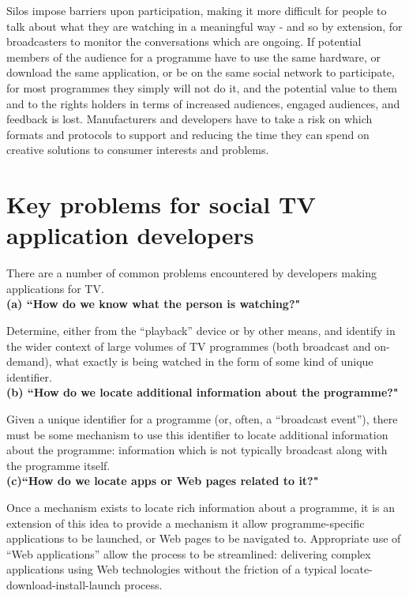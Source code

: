 \documentclass[]{article}%
\begin{document}
Silos impose barriers upon participation, making it more difficult for people to talk about what they are watching in a meaningful way - and so by extension, for broadcasters to monitor the conversations which are ongoing. If potential members of the audience for a programme have to use the same hardware, or download the same application, or be on the same social network to participate, for most programmes they simply will not do it, and the potential value to them and to the rights holders in terms of  increased audiences, engaged audiences, and feedback is lost. Manufacturers and developers have to take a risk on which formats and protocols to support and reducing the time they can spend on creative solutions to consumer interests and problems. 

\section{Key problems for social TV application developers}

There are a number of common problems encountered by developers making applications for TV.
\\

{\bf{(a) ``How do we know what the person is watching?" }}

Determine, either from the ``playback'' device or by other means, and identify in the wider context of large volumes of TV programmes (both broadcast and on-demand), what exactly is being watched in the form of some kind of unique identifier.
\\

{\bf{(b) ``How do we locate additional information about the programme?" }}

Given a unique identifier for a programme (or, often, a ``broadcast event''), there must be some mechanism to use this identifier to locate additional information about the programme: information which is not typically broadcast along with the programme itself. 
\\

{\bf{(c)``How do we locate apps or Web pages related to it?" }}

Once a mechanism exists to locate rich information about a programme, it is an extension of this idea to provide a mechanism it allow programme-specific applications to be launched, or Web pages to be navigated to. Appropriate use of ``Web applications'' allow the process to be streamlined: delivering complex applications using Web technologies without the friction of a typical locate-download-install-launch process.
\\
\end{document}
